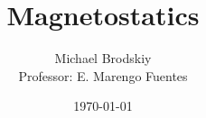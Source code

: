 


\title{Magnetostatics}
\date{\today}
\author{Michael Brodskiy\\ \small Professor: E. Marengo Fuentes}



\maketitle

